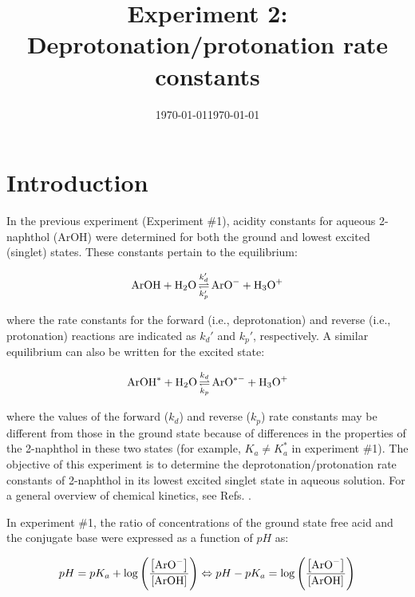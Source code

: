 \documentclass[byrevtex,amssymb,aps,pra,floatfix,letterpaper]{revtex4}
\date{\today}
\begin{document}
\title{Experiment 2: Deprotonation/protonation rate constants}

\date{\today}

\maketitle

\section{Introduction}

In the previous experiment (Experiment \#1), acidity constants for aqueous 2-naphthol (ArOH) were determined for both the ground and lowest excited (singlet) states. These constants pertain to the equilibrium:

\begin{equation}
\textnormal{ArOH} + \textnormal{H}_2\textnormal{O} \mathop\rightleftharpoons\limits^{k_d'}_{k_p'} \textnormal{ArO}^- + \textnormal{H}_3\textnormal{O}^+
\label{eq1}
\end{equation}

\noindent
where the rate constants for the forward (i.e., deprotonation) and reverse (i.e., protonation) reactions are indicated as $k_d'$ and $k_p'$, respectively. A similar equilibrium can also be written for the excited state:

\begin{equation}
\textnormal{ArOH}^* + \textnormal{H}_2\textnormal{O} \mathop\rightleftharpoons\limits^{k_d}_{k_p} \textnormal{ArO}^{*-} + \textnormal{H}_3\textnormal{O}^+
\label{eq2}
\end{equation}

\noindent
where the values of the forward ($k_d$) and reverse ($k_p$) rate constants may be different from those in the ground state because of differences in the properties of the 2-naphthol in these two states (for example, $K_a \ne K_a^*$ in experiment \#1). The objective of this experiment is to determine the deprotonation/protonation rate constants of 2-naphthol in its lowest excited singlet state in aqueous solution. For a general overview of chemical kinetics, see Refs. \cite{ATKINS1,SILBEY}.

In experiment \#1, the ratio of concentrations of the ground state free acid and the conjugate base were expressed as a function of $pH$ as:

\begin{equation}
pH = pK_a + \log\left(\frac{\left[\textnormal{ArO}^-\right]}{\left[\textnormal{ArOH}\right]}\right) \Leftrightarrow pH - pK_a = \log\left(\frac{\left[\textnormal{ArO}^-\right]}{\left[\textnormal{ArOH}\right]}\right)
\label{eq3}
\end{equation}
\end{document}
